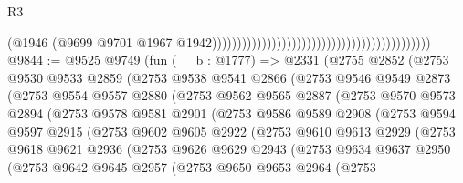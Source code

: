\begin{lexlean}{R3}
\begin{coremodule}
                                                                                        (@1946
                                                                                          (@9699
                                                                                            @9701
                                                                                            @1967
                                                                                            @1942))))))))))))))))))))))))))))))))))))))))))))
@9844 := @9525
    @9749
    (fun (__b : @1777) =>
    @2331
      (@2755
        @2852
        (@2753
          @9530
          @9533
          @2859
          (@2753
            @9538
            @9541
            @2866
            (@2753
              @9546
              @9549
              @2873
              (@2753
                @9554
                @9557
                @2880
                (@2753
                  @9562
                  @9565
                  @2887
                  (@2753
                    @9570
                    @9573
                    @2894
                    (@2753
                      @9578
                      @9581
                      @2901
                      (@2753
                        @9586
                        @9589
                        @2908
                        (@2753
                          @9594
                          @9597
                          @2915
                          (@2753
                            @9602
                            @9605
                            @2922
                            (@2753
                              @9610
                              @9613
                              @2929
                              (@2753
                                @9618
                                @9621
                                @2936
                                (@2753
                                  @9626
                                  @9629
                                  @2943
                                  (@2753
                                    @9634
                                    @9637
                                    @2950
                                    (@2753
                                      @9642
                                      @9645
                                      @2957
                                      (@2753
                                        @9650
                                        @9653
                                        @2964
                                        (@2753

\end{coremodule}
\end{lexlean}
